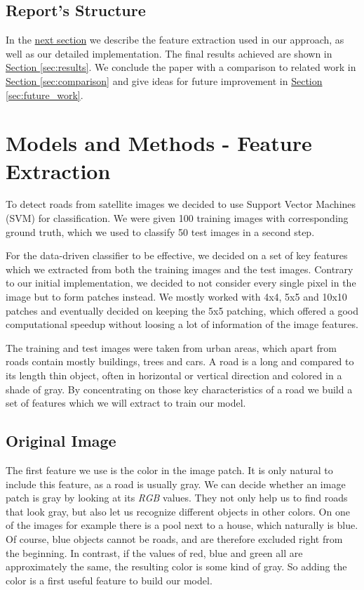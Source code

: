 \documentclass[10pt,conference,compsocconf]{IEEEtran}
\newcommand{\secref}[1]{\hyperref[#1]{Section \ref*{#1}}}
\begin{document}
\subsection*{Report's Structure}
In the \hyperref[sec:feature_extraction]{next section} we describe the feature extraction used in our approach, as well as our detailed implementation. The final results achieved are shown in \secref{sec:results}. We conclude the paper with a comparison to related work in \secref{sec:comparison} and give ideas for future improvement in \secref{sec:future_work}.

\section{Models and Methods - Feature Extraction}
\label{sec:feature_extraction}
To detect roads from satellite images we decided to use Support Vector Machines (SVM) for classification. We were given 100 training images with corresponding ground truth, which we used to classify 50 test images in a second step.

For the data-driven classifier to be effective, we decided on a set of key features which we extracted from both the training images and the test images. Contrary to our initial implementation, we decided to not consider every single pixel in the image but to form patches instead. We mostly worked with 4x4, 5x5 and 10x10 patches and eventually decided on keeping the 5x5 patching, which offered a good computational speedup without loosing a lot of information of the image features.

The training and test images were taken from urban areas, which apart from roads contain mostly buildings, trees and cars. A road is a long and compared to its length thin object, often in horizontal or vertical direction and colored in a shade of gray. By concentrating on those key characteristics of a road we build a set of features which we will extract to train our model.

\subsection{Original Image}
The first feature we use is the color in the image patch. It is only natural to include this feature, as a road is usually gray. We can decide whether an image patch is gray by looking at its \emph{RGB} values. They not only help us to find roads that look gray, but also let us recognize different objects in other colors. On one of the images for example there is a pool next to a house, which naturally is blue. Of course, blue objects cannot be roads, and are therefore excluded right from the beginning. In contrast, if the values of red, blue and green all are approximately the same, the resulting color is some kind of gray. So adding the color is a first useful feature to build our model. 
\end{document}
